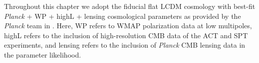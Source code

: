 Throughout this chapter we adopt the fiducial flat \gls{LCDM} cosmology with best-fit \emph{Planck} + WP + highL + lensing cosmological parameters as provided by the \emph{Planck} team in \cite{Ade2014d}. Here, WP refers to WMAP polarization data at low multipoles, highL refers to the inclusion of high-resolution \gls{CMB} data of the ACT and SPT experiments, and lensing refers to the inclusion of \emph{Planck} \gls{CMB} lensing data in the parameter likelihood.

%
%


